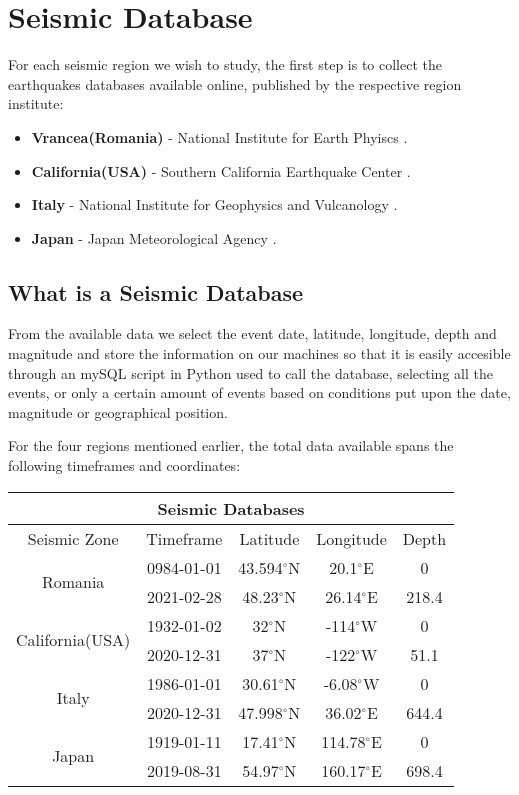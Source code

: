 \chapter{Seismic Database}
\label{chap:quakeDatabase}

For each seismic region we wish to study, the first step is to collect the earthquakes databases available online, published by the respective region institute:
\begin{itemize}
	\item {\bf Vrancea(Romania)} - National Institute for Earth Phyiscs \cite{INFP}.
	\item {\bf California(USA)} - Southern California Earthquake Center \cite{SCEC}.
	\item {\bf Italy} - National Institute for Geophysics and Vulcanology \cite{INGV}.
	\item {\bf Japan} - Japan Meteorological Agency \cite{JMA}.
\end{itemize}

\section{What is a Seismic Database}
From the available data we select the event date, latitude, longitude, depth and magnitude and store the information on our machines so that it is easily accesible through an mySQL script in Python used to call the database, selecting all the events, or only a certain amount of events based on conditions put upon the date, magnitude or geographical position. \par 
For the four regions mentioned earlier, the total data available spans the following timeframes and coordinates: 

\begin{center}
\centering
 \begin{tabular}{ |c||c|c|c|c|  }

 \hline
 \multicolumn{5}{|c|}{Seismic Databases} \\
 \hline
 Seismic Zone & Timeframe & Latitude & Longitude & Depth\\
 \hline
 \hline
 \multirow{2}{8em}{Romania} & 0984-01-01 & 43.594$^{\circ}$N & 20.1$^{\circ}$E & 0\\
 & 2021-02-28 & 48.23$^{\circ}$N & 26.14$^{\circ}$E & 218.4\\
 \hline
 \multirow{2}{8em}{California(USA)} & 1932-01-02 & 32$^{\circ}$N & -114$^{\circ}$W & 0\\
 & 2020-12-31 & 37$^{\circ}$N & -122$^{\circ}$W & 51.1\\
 \hline
 \multirow{2}{8em}{Italy} & 1986-01-01 & 30.61$^{\circ}$N & -6.08$^{\circ}$W & 0\\
 & 2020-12-31 & 47.998$^{\circ}$N & 36.02$^{\circ}$E & 644.4\\
 \hline
 \multirow{2}{8em}{Japan} & 1919-01-11 & 17.41$^{\circ}$N & 114.78$^{\circ}$E & 0\\
 & 2019-08-31 & 54.97$^{\circ}$N & 160.17$^{\circ}$E & 698.4\\
 \hline
 \end{tabular}
\end{center}

